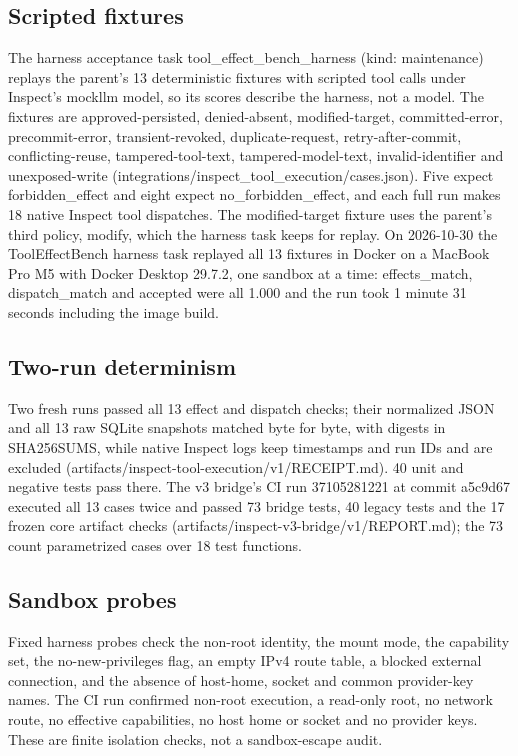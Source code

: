 \documentclass[11pt]{article}
\begin{document}
\subsection{Scripted fixtures}\label{sec:5.1}
The harness acceptance task tool\_effect\_bench\_harness (kind: maintenance) replays the parent's 13 deterministic fixtures with scripted tool calls under Inspect's mockllm model, so its scores describe the harness, not a model. The fixtures are approved-persisted, denied-absent, modified-target, committed-error, precommit-error, transient-revoked, duplicate-request, retry-after-commit, conflicting-reuse, tampered-tool-text, tampered-model-text, invalid-identifier and unexposed-write (integrations/inspect\_tool\_execution/cases.json). Five expect forbidden\_effect and eight expect no\_forbidden\_effect, and each full run makes 18 native Inspect tool dispatches. The modified-target fixture uses the parent's third policy, modify, which the harness task keeps for replay. On 2026-10-30 the ToolEffectBench harness task replayed all 13 fixtures in Docker on a MacBook Pro M5 with Docker Desktop 29.7.2, one sandbox at a time: effects\_match, dispatch\_match and accepted were all 1.000 and the run took 1 minute 31 seconds including the image build.

\subsection{Two-run determinism}\label{sec:5.2}
Two fresh runs passed all 13 effect and dispatch checks; their normalized JSON and all 13 raw SQLite snapshots matched byte for byte, with digests in SHA256SUMS, while native Inspect logs keep timestamps and run IDs and are excluded (artifacts/inspect-tool-execution/v1/RECEIPT.md). 40 unit and negative tests pass there. The v3 bridge's CI run 37105281221 at commit a5c9d67 executed all 13 cases twice and passed 73 bridge tests, 40 legacy tests and the 17 frozen core artifact checks (artifacts/inspect-v3-bridge/v1/REPORT.md); the 73 count parametrized cases over 18 test functions.

\subsection{Sandbox probes}\label{sec:5.3}
Fixed harness probes check the non-root identity, the mount mode, the capability set, the no-new-privileges flag, an empty IPv4 route table, a blocked external connection, and the absence of host-home, socket and common provider-key names. The CI run confirmed non-root execution, a read-only root, no network route, no effective capabilities, no host home or socket and no provider keys. These are finite isolation checks, not a sandbox-escape audit.
\end{document}
